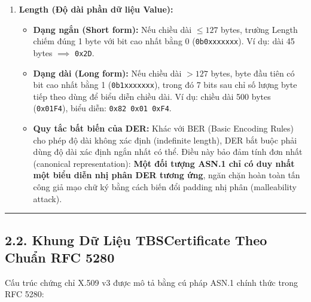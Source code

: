 \documentclass[
]{article}
\providecommand{\tightlist}{%
  \setlength{\itemsep}{0pt}\setlength{\parskip}{0pt}}
\begin{document}
\begin{enumerate}
\def\labelenumi{\arabic{enumi}.}
\setcounter{enumi}{1}
\tightlist
\item
  \textbf{Length (Độ dài phần dữ liệu Value):}

  \begin{itemize}
  \tightlist
  \item
    \textbf{Dạng ngắn (Short form):} Nếu chiều dài \(\le 127\) bytes,
    trường Length chiếm đúng 1 byte với bit cao nhất bằng 0
    (\texttt{0b0xxxxxxx}). Ví dụ: dài 45 bytes \(\implies\)
    \texttt{0x2D}.
  \item
    \textbf{Dạng dài (Long form):} Nếu chiều dài \(> 127\) bytes, byte
    đầu tiên có bit cao nhất bằng 1 (\texttt{0b1xxxxxxx}), trong đó 7
    bits sau chỉ số lượng byte tiếp theo dùng để biểu diễn chiều dài. Ví
    dụ: chiều dài 500 bytes (\texttt{0x01F4}), biểu diễn:
    \texttt{0x82\ 0x01\ 0xF4}.
  \item
    \textbf{Quy tắc bất biến của DER:} Khác với BER (Basic Encoding
    Rules) cho phép độ dài không xác định (indefinite length), DER bắt
    buộc phải dùng độ dài xác định ngắn nhất có thể. Điều này bảo đảm
    tính đơn nhất (canonical representation): \textbf{Một đối tượng
    ASN.1 chỉ có duy nhất một biểu diễn nhị phân DER tương ứng}, ngăn
    chặn hoàn toàn tấn công giả mạo chữ ký bằng cách biến đổi padding
    nhị phân (malleability attack).
  \end{itemize}
\end{enumerate}

\begin{center}\rule{0.5\linewidth}{0.5pt}\end{center}

\subsection{2.2. Khung Dữ Liệu TBSCertificate Theo Chuẩn RFC
5280}\label{khung-dux1eef-liux1ec7u-tbscertificate-theo-chuux1ea9n-rfc-5280}

Cấu trúc chứng chỉ X.509 v3 được mô tả bằng cú pháp ASN.1 chính thức
trong RFC 5280:
\end{document}
